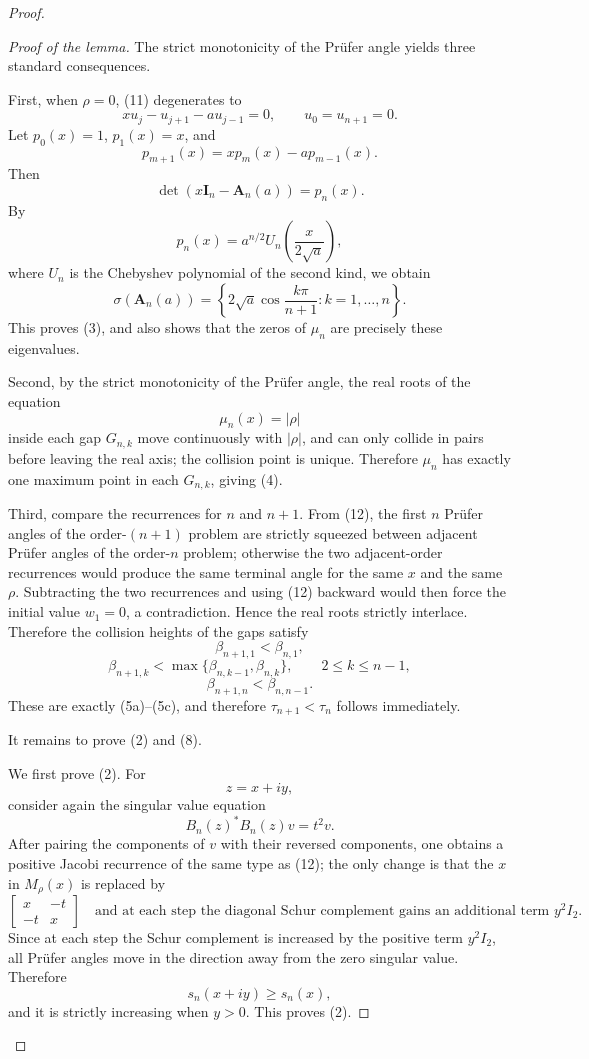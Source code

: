 \documentclass[11pt]{article}
\newcommand{\A}{\mathbf A}
\newcommand{\I}{\mathbf I}
\begin{document}
\begin{proof}
\begin{proof}[Proof of the lemma]
The strict monotonicity of the Prüfer angle yields three standard consequences.

First, when \(\rho=0\), (11) degenerates to
\[
xu_j-u_{j+1}-a u_{j-1}=0,
\qquad u_0=u_{n+1}=0.
\tag{16}
\]
Let \(p_0(x)=1\), \(p_1(x)=x\), and
\[
p_{m+1}(x)=xp_m(x)-a p_{m-1}(x).
\tag{17}
\]
Then
\[
\det(x\I_n-\A_n(a))=p_n(x).
\tag{18}
\]
By
\[
p_n(x)=a^{n/2}U_n\!\left(\frac{x}{2\sqrt a}\right),
\tag{19}
\]
where \(U_n\) is the Chebyshev polynomial of the second kind, we obtain
\[
\sigma(\A_n(a))
=
\left\{
2\sqrt a\cos\frac{k\pi}{n+1}:k=1,\dots,n
\right\}.
\tag{20}
\]
This proves (3), and also shows that the zeros of \(\mu_n\) are precisely these eigenvalues.

Second, by the strict monotonicity of the Prüfer angle, the real roots of the equation
\[
\mu_n(x)=|\rho|
\tag{21}
\]
inside each gap \(G_{n,k}\) move continuously with \(|\rho|\), and can only collide in pairs before leaving the real axis; the collision point is unique. Therefore \(\mu_n\) has exactly one maximum point in each \(G_{n,k}\), giving (4).

Third, compare the recurrences for \(n\) and \(n+1\). From (12), the first \(n\) Prüfer angles of the order-\((n+1)\) problem are strictly squeezed between adjacent Prüfer angles of the order-\(n\) problem; otherwise the two adjacent-order recurrences would produce the same terminal angle for the same \(x\) and the same \(\rho\). Subtracting the two recurrences and using (12) backward would then force the initial value \(w_1=0\), a contradiction. Hence the real roots strictly interlace. Therefore the collision heights of the gaps satisfy
\[
\beta_{n+1,1}<\beta_{n,1},
\]
\[
\beta_{n+1,k}<\max\{\beta_{n,k-1},\beta_{n,k}\},
\qquad 2\le k\le n-1,
\]
\[
\beta_{n+1,n}<\beta_{n,n-1}.
\]
These are exactly (5a)--(5c), and therefore \(\tau_{n+1}<\tau_n\) follows immediately.

It remains to prove (2) and (8).

We first prove (2). For
\[
z=x+iy,
\]
consider again the singular value equation
\[
B_n(z)^*B_n(z)v=t^2v.
\tag{22}
\]
After pairing the components of \(v\) with their reversed components, one obtains a positive Jacobi recurrence of the same type as (12); the only change is that the \(x\) in \(M_\rho(x)\) is replaced by
\[
\begin{bmatrix}
x&-t\\
-t&x
\end{bmatrix}
\quad\text{and at each step the diagonal Schur complement gains an additional term }y^2I_2.
\tag{23}
\]
Since at each step the Schur complement is increased by the positive term \(y^2I_2\), all Prüfer angles move in the direction away from the zero singular value. Therefore
\[
s_n(x+iy)\ge s_n(x),
\]
and it is strictly increasing when \(y>0\). This proves (2).


\end{proof}
\end{proof}
\end{document}

